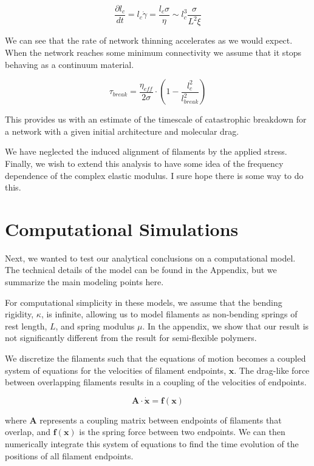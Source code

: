 \documentclass[prb,11pt]{revtex4-1}
\begin{document}
\begin{equation}
\frac{\partial l_c}{dt}=l_c\dot \gamma =\frac{l_c \sigma}{\eta}\sim l_c^3\frac{ \sigma}{L^2 \xi}
\end{equation}

We can see that the rate of network thinning accelerates as we would expect.  When the network reaches some minimum connectivity we assume that it stops behaving as a continuum material.  

\begin{equation}
\tau_{break} = \frac{\eta_{eff}}{2\sigma}\cdot\left ( 1 -\frac{l_c^2}{l_{break}^2} \right )
\end{equation}

This provides us with an estimate of the timescale of catastrophic breakdown for a network with a given initial architecture and molecular drag.

We have neglected the induced alignment of filaments by the applied stress.  Finally, we wish to extend this analysis to have some idea of the frequency dependence of the complex elastic modulus.  I sure hope there is some way to do this.



\section{Computational Simulations}

Next, we wanted to test our analytical conclusions on a computational model.  The technical details of the model can be found in the Appendix, but we summarize the main modeling points here.

For computational simplicity in these models, we assume that the bending rigidity, $\kappa$, is infinite, allowing us to model filaments as non-bending springs of rest length, $L$, and spring modulus $\mu$.  In the appendix, we show that our result is not significantly different from the result for semi-flexible polymers.

We discretize the filaments such that the equations of motion becomes a coupled system of equations for the velocities of filament endpoints, $\mathbf{x}$.  The drag-like force between overlapping filaments results in a coupling of the velocities of endpoints.  

\begin{equation}
\mathbf{A \cdot \dot x} = \mathbf{f(x)}
\end{equation}

where $\mathbf{A }$ represents a coupling matrix between endpoints of filaments that overlap, and $\mathbf{f(x)}$ is the spring force between two endpoints.  We can then numerically integrate this system of equations to find the time evolution of the positions of all filament endpoints.
\end{document}
